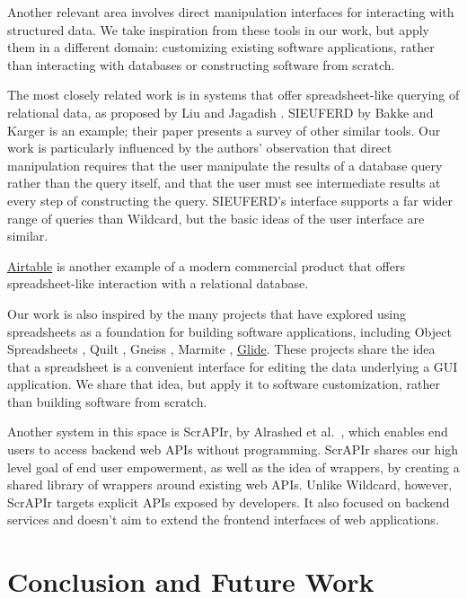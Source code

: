 \documentclass[sigplan,screen,10pt,anonymous,review]{acmart}
\begin{document}
Another relevant area involves direct manipulation interfaces for
interacting with structured data. We take inspiration from these tools
in our work, but apply them in a different domain: customizing existing
software applications, rather than interacting with databases or
constructing software from scratch.

The most closely related work is in systems that offer spreadsheet-like
querying of relational data, as proposed by Liu and Jagadish
\citep{liu2009}. SIEUFERD by Bakke and Karger \citep{bakke2016} is an
example; their paper presents a survey of other similar tools. Our work
is particularly influenced by the authors' observation that direct
manipulation requires that the user manipulate the results of a database
query rather than the query itself, and that the user must see
intermediate results at every step of constructing the query. SIEUFERD's
interface supports a far wider range of queries than Wildcard, but the
basic ideas of the user interface are similar.

\href{https://airtable.com/}{Airtable} is another example of a modern
commercial product that offers spreadsheet-like interaction with a
relational database.

Our work is also inspired by the many projects that have explored using
spreadsheets as a foundation for building software applications,
including Object Spreadsheets \citep{mccutchen2016}, Quilt
\citep{benson2014}, Gneiss \citep{chang2014}, Marmite \citep{wong2007},
\href{https://www.glideapps.com/}{Glide}. These projects share the idea
that a spreadsheet is a convenient interface for editing the data
underlying a GUI application. We share that idea, but apply it to
software customization, rather than building software from scratch.

Another system in this space is ScrAPIr, by Alrashed et
al.~\citep{alrashed2020}, which enables end users to access backend web
APIs without programming. ScrAPIr shares our high level goal of end user
empowerment, as well as the idea of wrappers, by creating a shared
library of wrappers around existing web APIs. Unlike Wildcard, however,
ScrAPIr targets explicit APIs exposed by developers. It also focused on
backend services and doesn't aim to extend the frontend interfaces of
web applications.

\hypertarget{sec:conclusion}{%
\section{Conclusion and Future Work}\label{sec:conclusion}}
\end{document}
